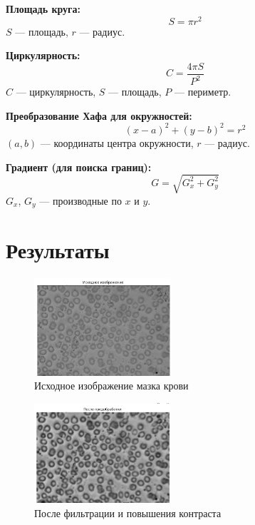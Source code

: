\documentclass[12pt,a4paper]{article}
\begin{document}
\textbf{Площадь круга:}
\begin{equation}
S = \pi r^2
\end{equation}
\noindent
$S$ --- площадь, $r$ --- радиус.

\textbf{Циркулярность:}
\begin{equation}
C = \frac{4\pi S}{P^2}
\end{equation}
\noindent
$C$ --- циркулярность, $S$ --- площадь, $P$ --- периметр.

\textbf{Преобразование Хафа для окружностей:}
\begin{equation}
(x - a)^2 + (y - b)^2 = r^2
\end{equation}
\noindent
$(a, b)$ --- координаты центра окружности, $r$ --- радиус.

\textbf{Градиент (для поиска границ):}
\begin{equation}
G = \sqrt{G_x^2 + G_y^2}
\end{equation}
\noindent
$G_x$, $G_y$ --- производные по $x$ и $y$.

\section*{Результаты}

\begin{figure}[H]
    \centering
    \includegraphics[width=0.45\textwidth]{original.png}
    \caption{Исходное изображение мазка крови}
\end{figure}

\begin{figure}[H]
    \centering
    \includegraphics[width=0.45\textwidth]{preprocessed.png}
    \caption{После фильтрации и повышения контраста}
\end{figure}
\end{document}
